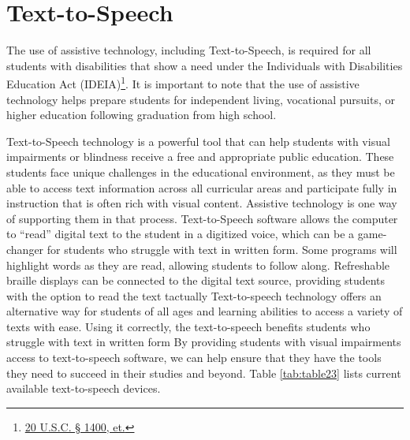 \pagebreak \hypertarget{text-to-speech}{}\section{Text-to-Speech}\label{text-to-speech}
The use of assistive technology, including Text-to-Speech, is required for all students with disabilities that show a need under the Individuals with Disabilities Education Act (IDEIA)\footnote{\raggedright \href{http://sites.ed.gov/idea/statuteregulations/}{20 U.S.C. § 1400, et.}}. It is important to note that the use of assistive technology helps prepare students for independent living, vocational pursuits, or higher education following graduation from high school. 

Text-to-Speech technology is a powerful tool that can help students with visual impairments or blindness receive a free and appropriate public education. These students face unique challenges in the educational environment, as they must be able to access text information across all curricular areas and participate fully in instruction that is often rich with visual content. Assistive technology is one way of supporting them in that process. Text-to-Speech software allows the computer to “read” digital text to the student in a digitized voice, which can be a game-changer for students who struggle with text in written form. Some programs will highlight words as they are read, allowing students to follow along. Refreshable braille displays can be connected to the digital text source, providing students with the option to read the text tactually Text-to-speech technology offers an alternative way for students of all ages and learning abilities to access a variety of texts with ease. Using it correctly, the text-to-speech benefits students who struggle with text in written form By providing students with visual impairments access to text-to-speech software, we can help ensure that they have the tools they need to succeed in their studies and beyond. Table \ref{tab:table23} lists current available text-to-speech devices.

\pagebreak 
 
